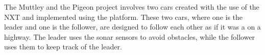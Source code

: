 The Muttley and the Pigeon project involves two cars created with the use of the \lego{} NXT and implemented using the \osek{} platform.
These two cars, where one is the leader and one is the follower, are designed to follow each other as if it was a \roadtrain{} on a highway.
The leader uses the sonar sensors to avoid obstacles, while the follower uses them to keep track of the leader.
